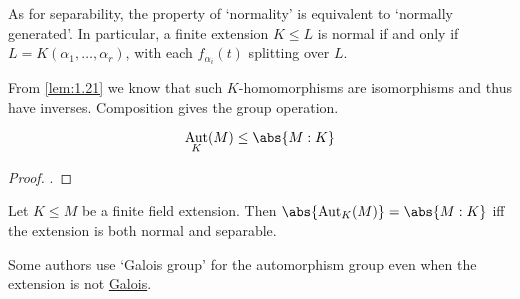 \documentclass{article}
\DeclareMathOperator{\Aut}{Aut}
\DeclareMathOperator{\Gal}{Gal}
\begin{document}
\begin{remark}
    As for separability, the property of `normality' is equivalent to `normally generated'.
    In particular, a finite extension $K \leq L$ is normal if and only if $L = K(\alpha_1, \dotsc, \alpha_r)$, with each $f_{\alpha_i}(t)$ splitting over $L$.
\end{remark}


From \cref{lem:1.21} we know that such $K$-homomorphisms are isomorphisms and thus have inverses. Composition gives the group operation.

\begin{nlemma}\label{lem:2.23}
    \begin{equation*}
        \Aut_K(M) \leq \abs{M:K}
    \end{equation*}
\end{nlemma}

\begin{proof}
    .
\end{proof}

\begin{nthm}\label{thm:2.24}
    Let $K \leq M$ be a finite field extension. Then $\abs{\Aut_K(M)} = \abs{M:K}$ iff the extension is both normal and separable.
\end{nthm}




\begin{remark}
    Some authors use `Galois group' for the automorphism group even when the extension is not \hyperlink{def:galoisExt}{Galois}.
\end{remark}
\end{document}
